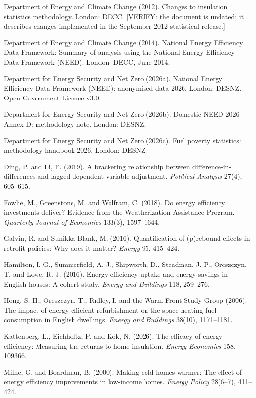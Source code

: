 \documentclass[11pt,a4paper]{article}
\begin{document}
\begin{list}{}{\setlength{\leftmargin}{1.5em}\setlength{\itemindent}{-1.5em}\setlength{\itemsep}{2pt}}
\item
  Department of Energy and Climate Change (2012). Changes to insulation statistics methodology. London: DECC. {[}VERIFY: the document is undated; it describes changes implemented in the September 2012 statistical release.{]}
\item
  Department of Energy and Climate Change (2014). National Energy Efficiency Data-Framework: Summary of analysis using the National Energy Efficiency Data-Framework (NEED). London: DECC, June 2014.
\item
  Department for Energy Security and Net Zero (2026a). National Energy Efficiency Data-Framework (NEED): anonymised data 2026. London: DESNZ. Open Government Licence v3.0.
\item
  Department for Energy Security and Net Zero (2026b). Domestic NEED 2026 Annex D: methodology note. London: DESNZ.
\item
  Department for Energy Security and Net Zero (2026c). Fuel poverty statistics: methodology handbook 2026. London: DESNZ.
\item
  Ding, P. and Li, F. (2019). A bracketing relationship between difference-in-differences and lagged-dependent-variable adjustment. \emph{Political Analysis} 27(4), 605--615.
\item
  Fowlie, M., Greenstone, M. and Wolfram, C. (2018). Do energy efficiency investments deliver? Evidence from the Weatherization Assistance Program. \emph{Quarterly Journal of Economics} 133(3), 1597--1644.
\item
  Galvin, R. and Sunikka-Blank, M. (2016). Quantification of (p)rebound effects in retrofit policies: Why does it matter? \emph{Energy} 95, 415--424.
\item
  Hamilton, I. G., Summerfield, A. J., Shipworth, D., Steadman, J. P., Oreszczyn, T. and Lowe, R. J. (2016). Energy efficiency uptake and energy savings in English houses: A cohort study. \emph{Energy and Buildings} 118, 259--276.
\item
  Hong, S. H., Oreszczyn, T., Ridley, I. and the Warm Front Study Group (2006). The impact of energy efficient refurbishment on the space heating fuel consumption in English dwellings. \emph{Energy and Buildings} 38(10), 1171--1181.
\item
  Kattenberg, L., Eichholtz, P. and Kok, N. (2026). The efficacy of energy efficiency: Measuring the returns to home insulation. \emph{Energy Economics} 158, 109366.
\item
  Milne, G. and Boardman, B. (2000). Making cold homes warmer: The effect of energy efficiency improvements in low-income homes. \emph{Energy Policy} 28(6--7), 411--424.

\end{list}
\end{document}
